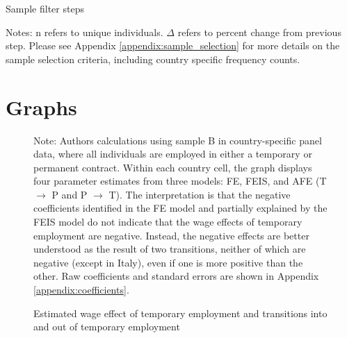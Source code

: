 \begin{table}[!h]
    \caption{Sample filter steps}
    \resizebox{\textwidth}{!}{}
    \label{table_sample_filter_steps_country}
    \scriptsize{Notes: n refers to unique individuals. $\Delta$ refers to percent change from previous step.  Please see Appendix \ref{appendix:sample_selection} for more details on the sample selection criteria, including country specific frequency counts.}
\end{table}


\clearpage
\section{Graphs}

\begin{figure}
    \caption{Estimated wage effect of temporary employment and transitions into and out of temporary employment}
    \label{graph_contyp}
    \footnotesize{Note: Authors calculations using sample B in country-specific panel data, where all individuals are employed in either a temporary or permanent contract.  Within each country cell, the graph displays four parameter estimates from three models: FE, FEIS, and AFE (T $\rightarrow$ P and P $\rightarrow$ T).  The interpretation is that the negative coefficients identified in the FE model and partially explained by the FEIS model do not indicate that the wage effects of temporary employment are negative.  Instead, the negative effects are better understood as the result of two transitions, neither of which are negative (except in Italy), even if one is more positive than the other.  Raw coefficients and standard errors are shown in Appendix \ref{appendix:coefficients}.}
\end{figure}

